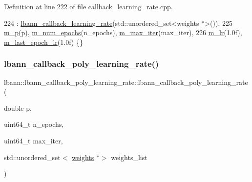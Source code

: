 Definition at line 222 of file callback\+\_\+learning\+\_\+rate.\+cpp.


\begin{DoxyCode}
224   : \hyperlink{classlbann_1_1lbann__callback__learning__rate_a69687cd55f4d09c480e08e18488519fe}{lbann\_callback\_learning\_rate}(std::unordered\_set<weights *>()),
225     \hyperlink{classlbann_1_1lbann__callback__poly__learning__rate_a03c8c9a738036f9b778f11416112fd80}{m\_p}(p), \hyperlink{classlbann_1_1lbann__callback__poly__learning__rate_a493de3bbdea4bed802e663af9b81af8e}{m\_num\_epochs}(n\_epochs), \hyperlink{classlbann_1_1lbann__callback__poly__learning__rate_a43c06187577baff885bda6177fe56c3f}{m\_max\_iter}(max\_iter),
226     \hyperlink{classlbann_1_1lbann__callback__poly__learning__rate_a02cb265abba03e10fcba2be3cbbafce4}{m\_lr}(1.0f), \hyperlink{classlbann_1_1lbann__callback__poly__learning__rate_aad95c34cfb705392bf38ecbb0dc97b32}{m\_last\_epoch\_lr}(1.0f) \{\}
\end{DoxyCode}
\mbox{\label{classlbann_1_1lbann__callback__poly__learning__rate_a4aba2a61c3b5d08c08909b7a4d78ea74}} 
\subsubsection{\texorpdfstring{lbann\+\_\+callback\+\_\+poly\+\_\+learning\+\_\+rate()}{lbann\_callback\_poly\_learning\_rate()}\hspace{0.1cm}{\footnotesize\ttfamily [2/3]}}
{\footnotesize\ttfamily lbann\+::lbann\+\_\+callback\+\_\+poly\+\_\+learning\+\_\+rate\+::lbann\+\_\+callback\+\_\+poly\+\_\+learning\+\_\+rate (\begin{DoxyParamCaption}\item[{double}]{p,  }\item[{uint64\+\_\+t}]{n\+\_\+epochs,  }\item[{uint64\+\_\+t}]{max\+\_\+iter,  }\item[{std\+::unordered\+\_\+set$<$ \hyperlink{classlbann_1_1weights}{weights} $\ast$$>$}]{weights\+\_\+list }\end{DoxyParamCaption})}



